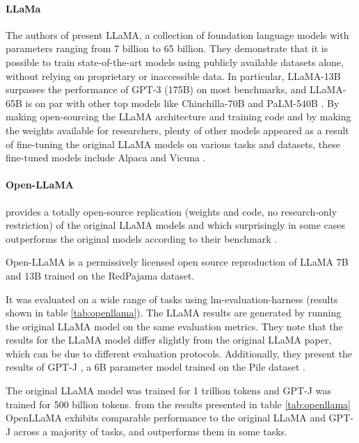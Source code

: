 \documentclass[a4paper,12pt]{article}
\begin{document}
\paragraph*{LLaMa}
The authors of \cite{llama} present LLaMA, a collection of foundation language models with parameters ranging from 7 billion to 65 billion. 
They demonstrate that it is possible to train state-of-the-art models using publicly available datasets alone, without relying on proprietary or inaccessible data. 
In particular, LLaMA-13B surpasses the performance of GPT-3 (175B) \cite{gpt3} on most benchmarks, and LLaMA-65B is on par with other top models like Chinchilla-70B \cite{chinchilla} and PaLM-540B \cite{palm}. 
By making open-sourcing the LLaMA architecture and training code and by making the weights available for researchers, plenty of other models appeared as a result of fine-tuning the original LLaMA models on various tasks and datasets, 
these fine-tuned models include Alpaca \cite{alpaca} and Vicuna \cite{vicuna}.     

\paragraph*{Open-LLaMA} \cite{openllama} provides a totally open-source replication (weights and code, no research-only restriction) of the original LLaMA \cite{llama} models and which surprisingly in some cases outperforms the original models according to their benchmark \cite{openllama}.

Open-LLaMA is a permissively licensed open source reproduction of LLaMA \cite{llama} 7B and 13B trained on the RedPajama \cite{redpajama} dataset. 

It was evaluated on a wide range of tasks using lm-evaluation-harness \cite{eval-harness} (results shown in table \ref*{tab:openllama}). 
The LLaMA \cite{llama} results are generated by running the original LLaMA model on the same evaluation metrics. 
They note that the results for the LLaMA model differ slightly from the original LLaMA paper, which can be due to different evaluation protocols. 
Additionally, they present the results of GPT-J \cite{gptj}, a 6B parameter model trained on the Pile dataset \cite{pile}.

The original LLaMA model was trained for 1 trillion tokens and GPT-J was trained for 500 billion tokens. from the results presented in table \ref*{tab:openllama} 
OpenLLaMA exhibits comparable performance to the original LLaMA \cite{llama} and GPT-J \cite{gptj} across a majority of tasks, and outperforms them in some tasks.
\end{document}
